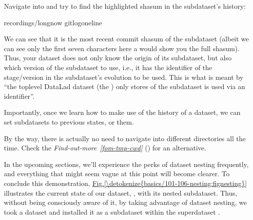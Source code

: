 \sphinxAtStartPar
Navigate into  and try to find the highlighted shasum in the
subdataset’s history:

%
\begin{sphinxVerbatim}[commandchars=\\\{\}]
recordings/longnow
gitlog\PYGZhy{}\PYGZhy{}oneline
\end{sphinxVerbatim}
\sphinxresetverbatimhllines

\sphinxAtStartPar
We can see that it is the most recent commit shasum of the subdataset
(albeit we can see only the first seven characters here \textendash{} a 
would show you the full shasum). Thus, your dataset does not only know the origin
of its subdataset, but also which version of the subdataset to use,
i.e., it has the identifier of the stage/version in the subdataset’s evolution to be used.
This is what is meant by “the top\sphinxhyphen{}level DataLad dataset (the ) only stores
 of the subdataset is used via an identifier”.

\sphinxAtStartPar
Importantly, once we learn how to make use of the history of a dataset,
we can set subdatasets to previous states, or  them.

\sphinxAtStartPar
By the way, there is actually no need to navigate into different directories all the time.
Check the \textit{Find-out-more}~{\findoutmoreiconinline}\textit{\ref{fom-tmp-cwd}} {\hyperref[\detokenize{basics/101-106-nesting:fom-tmp-cwd}]{}} () for
an alternative.

\sphinxAtStartPar
In the upcoming sections, we’ll experience the perks of dataset nesting
frequently, and everything that might seem vague at this point will become
clearer. To conclude this demonstration,
\hyperref[\detokenize{basics/101-106-nesting:fignesting}]{Fig.\@ \ref{\detokenize{basics/101-106-nesting:fignesting}}} illustrates the current state of our dataset, , with its nested subdataset.
Thus, without being consciously aware of it, by taking advantage of dataset
nesting, we took a dataset  and installed it as a
subdataset within the superdataset  .

